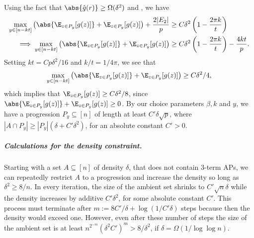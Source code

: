 \documentclass{article}
\begin{document}
Using the fact that $\abs{\hat{g}(r)} \geq \Omega(\delta^2)$ and , we have
\begin{align*}
    \max_{y\in [n-kt]}\left(\abs{\E_{z\in P_y}[g(z)]} + \E_{z\in P_y}[g(z)]\right) +  \frac{2|E_2|}{p} &\geq C\delta^2\left(1 - \frac{2\pi k}{t}\right) \\
    \implies \max_{y\in [n-kt]}\left(\abs{\E_{z\in P_y}[g(z)]} + \E_{z\in P_y}[g(z)]\right) &\geq C\delta^2\left(1 - \frac{2\pi k}{t}\right) - \frac{4kt}{p}.
\end{align*}
Setting $kt = Cp\delta^2/16$ and $k/t = 1/4\pi$, we see that 
\begin{align*}
    \max_{y\in [n-kt]}\left(\abs{\E_{z\in P_y}[g(z)]} + \E_{z\in P_y}[g(z)]\right) \geq C\delta^2/4,
\end{align*}
which implies that $\E_{z\in P_y}[g(z)] \geq C\delta^2/8$, since $\abs{\E_{z\in P_y}[g(z)]} + \E_{z\in P_y}[g(z)] \geq 0$. By our choice parameters $\beta,k$ and $y$, we have a progression $P_y\subseteq [n]$ of length at least $C'\delta\sqrt{p}$, where $|A\cap P_y| \geq |P_y|(\delta+C'\delta^2)$, for an absolute constant $C' > 0$.

\subparagraph*{Calculations for the density constraint.} Starting with a set $A \subseteq [n]$ of density $\delta$, that does not contain $3$-term APs, we can repeatedly restrict $A$ to a progression and increase the density so long as $\delta^2 \geq 8/n$. In every iteration, the size of the ambient set shrinks to $C'\sqrt{n}\delta$ while the density increases by additive $C'\delta^2$, for some absolute constant $C'$. This process must terminate after $m := 8C'/\delta + \log(1/C'\delta)$ steps because then the density would exceed one. However, even after these number of steps the size of the ambient set is at least $n^{2^{-m}}(\delta^2C')^{m} > 8/\delta^2$, if $\delta = \Omega(1/\log \log n)$. 
\end{document}

